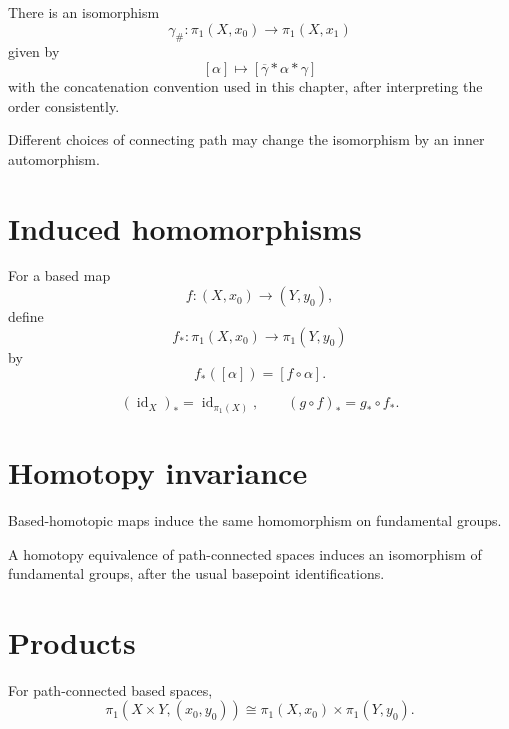 \begin{theorem}
\label{thm:viii09-basepoint}
There is an isomorphism
\[
\gamma_\#:\pi_1(X,x_0)\to\pi_1(X,x_1)
\]
given by
\[
[\alpha]
\longmapsto
[\overline\gamma*\alpha*\gamma]
\]
with the concatenation convention used in this chapter, after interpreting the
order consistently.
\end{theorem}

Different choices of connecting path may change the isomorphism by an inner
automorphism.

\section{Induced homomorphisms}

For a based map
\[
f:(X,x_0)\to(Y,y_0),
\]
define
\[
f_*:\pi_1(X,x_0)\to\pi_1(Y,y_0)
\]
by
\[
f_*([\alpha])=[f\circ\alpha].
\]

\begin{theorem}[Functoriality]
\label{thm:viii09-functorial}
\[
(\operatorname{id}_X)_*=\operatorname{id}_{\pi_1(X)},
\qquad
(g\circ f)_*=g_*\circ f_*.
\]
\end{theorem}

\section{Homotopy invariance}

\begin{theorem}
\label{thm:viii09-based-homotopy}
Based-homotopic maps induce the same homomorphism on fundamental groups.
\end{theorem}

\begin{corollary}
\label{cor:viii09-equivalence}
A homotopy equivalence of path-connected spaces induces an isomorphism of
fundamental groups, after the usual basepoint identifications.
\end{corollary}

\section{Products}

\begin{theorem}
\label{thm:viii09-product}
For path-connected based spaces,
\[
\pi_1(X\times Y,(x_0,y_0))
\cong
\pi_1(X,x_0)\times\pi_1(Y,y_0).
\]
\end{theorem}

